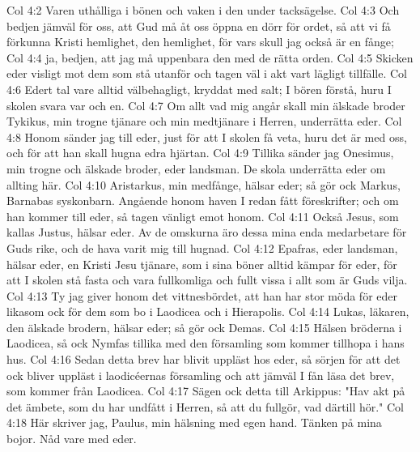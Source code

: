 Col 4:2  Varen uthålliga i bönen och vaken i den under tacksägelse.
Col 4:3  Och bedjen jämväl för oss, att Gud må åt oss öppna en dörr för ordet, så att vi få förkunna Kristi hemlighet, den hemlighet, för vars skull jag också är en fånge;
Col 4:4  ja, bedjen, att jag må uppenbara den med de rätta orden.
Col 4:5  Skicken eder visligt mot dem som stå utanför och tagen väl i akt vart lägligt tillfälle.
Col 4:6  Edert tal vare alltid välbehagligt, kryddat med salt; I bören förstå, huru I skolen svara var och en.
Col 4:7  Om allt vad mig angår skall min älskade broder Tykikus, min trogne tjänare och min medtjänare i Herren, underrätta eder.
Col 4:8  Honom sänder jag till eder, just för att I skolen få veta, huru det är med oss, och för att han skall hugna edra hjärtan.
Col 4:9  Tillika sänder jag Onesimus, min trogne och älskade broder, eder landsman. De skola underrätta eder om allting här.
Col 4:10  Aristarkus, min medfånge, hälsar eder; så gör ock Markus, Barnabas syskonbarn. Angående honom haven I redan fått föreskrifter; och om han kommer till eder, så tagen vänligt emot honom.
Col 4:11  Också Jesus, som kallas Justus, hälsar eder. Av de omskurna äro dessa mina enda medarbetare för Guds rike, och de hava varit mig till hugnad.
Col 4:12  Epafras, eder landsman, hälsar eder, en Kristi Jesu tjänare, som i sina böner alltid kämpar för eder, för att I skolen stå fasta och vara fullkomliga och fullt vissa i allt som är Guds vilja.
Col 4:13  Ty jag giver honom det vittnesbördet, att han har stor möda för eder likasom ock för dem som bo i Laodicea och i Hierapolis.
Col 4:14  Lukas, läkaren, den älskade brodern, hälsar eder; så gör ock Demas.
Col 4:15  Hälsen bröderna i Laodicea, så ock Nymfas tillika med den församling som kommer tillhopa i hans hus.
Col 4:16  Sedan detta brev har blivit uppläst hos eder, så sörjen för att det ock bliver uppläst i laodicéernas församling och att jämväl I fån läsa det brev, som kommer från Laodicea.
Col 4:17  Sägen ock detta till Arkippus: "Hav akt på det ämbete, som du har undfått i Herren, så att du fullgör, vad därtill hör."
Col 4:18  Här skriver jag, Paulus, min hälsning med egen hand. Tänken på mina bojor. Nåd vare med eder.


